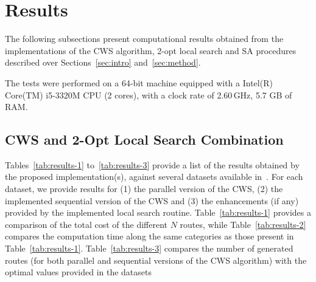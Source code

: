 \section{Results}
\label{sec:results}

The following subsections present computational results obtained from the 
implementations of the CWS algorithm, 2-opt local search and SA procedures 
described over Sections~\ref{sec:intro} and~\ref{sec:method}.\vertbreak

The tests were performed on a 64-bit machine equipped with a Intel(R) Core(TM) 
i5-3320M CPU (2 cores), with a clock rate of 2.60\,GHz, 5.7 GB of RAM.

\subsection{CWS and 2-Opt Local Search Combination}
\label{subsec:res-cws}

Tables~\ref{tab:results-1} to~\ref{tab:results-3} provide a list of the 
results obtained by the proposed implementation(s), against several 
datasets available in~\cite{website:cvrp-datasets}. For each dataset, we provide 
results for (1) the parallel version of the CWS, (2) the implemented sequential 
version of the CWS and (3) the enhancements (if any) provided by the implemented 
local search routine. Table~\ref{tab:results-1} provides a comparison of the 
total cost of the different $N$ routes, while Table~\ref{tab:results-2} compares 
the computation time along the same categories as those present in 
Table~\ref{tab:results-1}. Table~\ref{tab:results-3} compares the number of 
generated routes (for both parallel and sequential versions of the CWS 
algorithm) with the optimal values provided in the 
datasets~\cite{website:cvrp-datasets}\vertbreak

